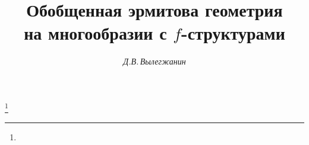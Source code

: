 




%


\newcommand{\la}{\langle}


\newcommand{\ra}{\rangle}




\newcommand{\id}{\operatorname{id}}


\newcommand{\diag}{\operatorname{diag}}


\newcommand{\tts}[1]{} 










\setcounter{page}{28}















\author{\it Д.В.\,Вылегжанин}




\title{Обобщенная эрмитова геометрия\\ на многообразии с $f$-структурами}


\thanks{}





\date{}




\pagestyle{plain} %







\maketitle


